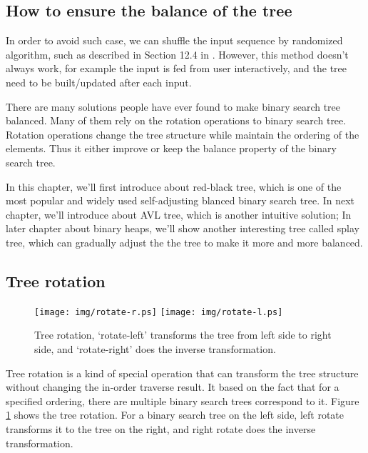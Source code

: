 \documentclass{article}
\begin{document}
\subsection{How to ensure the balance of the tree}
In order to avoid such case, we can shuffle the input sequence by 
randomized algorithm, such as described in Section 12.4 in \cite{CLRS}.
However, this method doesn't always work, for example the input is fed 
from user interactively, and the tree need to be built/updated after each input.

There are many solutions people have ever found to make binary search tree balanced.
Many of them rely on the rotation operations to binary search tree. 
Rotation operations change the tree structure while maintain the ordering
of the elements. Thus it either improve or keep the balance property of the binary
search tree.

In this chapter, we'll first introduce about red-black tree, which is one of the 
most popular and widely used self-adjusting blanced 
binary search tree. In next chapter, we'll introduce about AVL tree, which is 
another intuitive solution; In later chapter about binary heaps, we'll show another 
interesting tree called splay tree, which can gradually adjust the the tree to make it
more and more balanced.

\subsection{Tree rotation}

\begin{figure}[htbp]
       \begin{center}
       \texttt{[image: img/rotate-r.ps]} \texttt{[image: img/rotate-l.ps]} 
       \caption{Tree rotation, `rotate-left' transforms the tree from left side to right side, and `rotate-right' does the inverse transformation.} \label{fig:tree-rotation}
       \end{center}
\end{figure}

Tree rotation is a kind of special operation that can transform the tree structure
without changing the in-order traverse result. It based on the fact that
for a specified ordering, there are multiple binary search trees correspond to it.
Figure \ref{fig:tree-rotation} shows the tree rotation. For a binary search tree
on the left side, left rotate transforms it to the tree on the right, and right
rotate does the inverse transformation.
\end{document}
